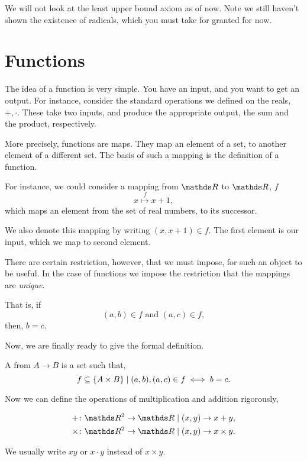 We will not look at the least upper bound axiom as of now. Note we still haven't 
shown the existence of radicals, which you must take for granted for now.

\section{Functions}

The idea of a function is very simple. You have an input, and you want to get 
an output. For instance, consider the standard operations we defined on the reals,
\(+, \cdot\). These take two inputs, and produce the appropriate output, the sum 
and the product, respectively.

More precisely, functions are maps. They map an element of a set, to another 
element of a different set. The basis of such a mapping is the definition of a 
function.

For instance, we could consider a mapping from \(\RR\) to \(\RR\), \(f\) 
\begin{equation*}
    x \overset{f}{\mapsto} x + 1,
\end{equation*}
which maps an element from the set of real numbers, to its successor.

We also denote this mapping by writing \((x, x + 1) \in f\). The first element 
is our input, which we map to second element. 

There are certain restriction, however, that we must impose, for such an object 
to be useful. In the case of functions we impose the restriction 
that the mappings are \emph{unique}. 

That is, if 
\begin{equation*}
    (a, b) \in f \text{ and } (a, c) \in f, 
\end{equation*}
then, \(b = c\).

Now, we are finally ready to give the formal definition.

\begin{definition}
    A  from \(A \to B\) is a set such that,
    \begin{equation}
        f \subseteq \left\{A \times B\right\} \mid (a, b), (a, c) \in f \iff b = c.
    \end{equation}
\end{definition}

Now we can define the operations of multiplication and addition rigorously, 

\begin{align*}
    + \colon &\RR^2 \to \RR \given (x, y) \to x + y, \\
    \times \colon &\RR^2 \to \RR \given (x, y) \to x \times y.
\end{align*}

We usually write \(xy\) or \(x \cdot y\) instead of \(x \times y\).

